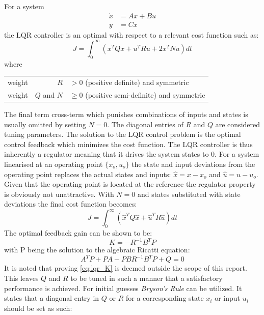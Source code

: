 For a system
\begin{equation}\label{eq:ctrl_sys}
	\begin{split}
		\dot x &= A x + B u \\
		y &= Cx
	\end{split}
\end{equation}
the LQR controller is an optimal with respect to a relevant cost function such as:
\begin{equation}\label{eq:lqr_cost}
	J = \int_{0}^{\infty} \left(x^T Q x + u^T R u + 2x^T N u\right) dt
\end{equation}
where
\begin{center}
	\begin{tabular}{l r l }
		weight & $R$         & $ > 0$ (positive definite) and symmetric       \\
		weight & $Q$ and $N$ & $\ge 0$ (positive semi-definite) and symmetric
	\end{tabular}
\end{center}
\smallskip
The final term cross-term which punishes combinations of inputs and states is usually omitted by setting $ N = 0 $. The diagonal entries of $ R $ and $ Q $ are considered tuning parameters. The solution to the LQR control problem is the optimal control feedback which minimizes the cost function. The LQR controller is thus inherently a regulator meaning that it drives the system states to 0. For a system linearised at an operating point $ \{x_o, u_o\} $ the state and input deviations from the operating point replaces the actual states and inputs: $ \hat x = x-x_o $ and $ \hat u = u-u_o $. Given that the operating point is located at the reference the regulator property is obviously not unattractive. With $ N = 0 $ and states substituted with state deviations the final cost function becomes:
\begin{equation}\label{eq:lqr_cost_final}
	J = \int_{0}^{\infty} \left(\hat x^T Q \hat x + \hat u^T R \hat u\right) dt
\end{equation}
The optimal feedback gain can be shown to be: 
\begin{equation}\label{eq:lqr_K}
	K = -R^{-1} B^T P
\end{equation}
with P being the solution to the algebraic Ricatti equation:
\begin{equation}\label{lqr:ricatti}
	A^T P + P A - P B R^{-1} B^T P + Q = 0
\end{equation}
It is noted that proving \cref{eq:lqr_K} is deemed outside the scope of this report. This leaves $ Q $ and $ R $ to be tuned in such a manner that a satisfactory performance is achieved. For initial guesses \textit{Bryson's Rule} can be utilized. It states that a diagonal entry in $ Q $ or $ R $ for a corresponding state $ x_i $ or input $ u_i $ should be set as such:
